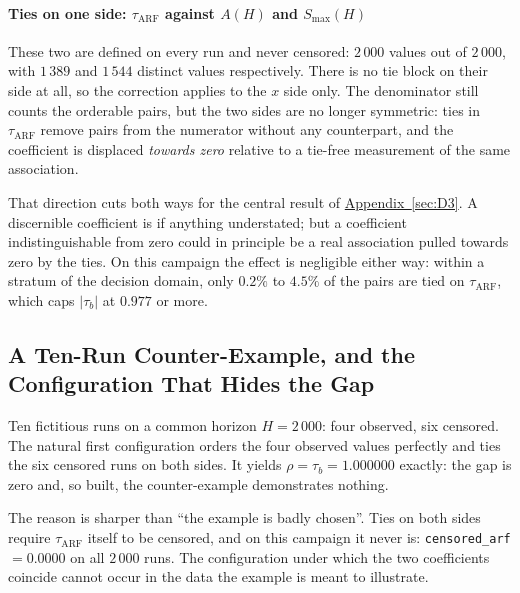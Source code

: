 \documentclass[10pt,conference]{IEEEtran}
\theoremstyle{definition}
\begin{document}
\paragraph{Ties on one side: $\tau_{\mathrm{ARF}}$ against $A(H)$ and $S_{\max}(H)$}
These two are defined on every run and never censored: $2\,000$ values out of $2\,000$,
with $1\,389$ and $1\,544$ distinct values respectively. There is no tie block on their
side at all, so the correction applies to the $x$ side only. The denominator still counts
the orderable pairs, but the two sides are no longer symmetric: ties in
$\tau_{\mathrm{ARF}}$ remove pairs from the numerator without any counterpart, and the
coefficient is displaced \emph{towards zero} relative to a tie-free measurement of the
same association.

That direction cuts both ways for the central result of \hyperref[sec:D3]{Appendix~\ref*{sec:D3}}. A
discernible coefficient is if anything understated; but a coefficient indistinguishable
from zero could in principle be a real association pulled towards zero by the ties. On this
campaign the effect is negligible either way: within a stratum of the decision domain,
only $0.2\%$ to $4.5\%$ of the pairs are tied on $\tau_{\mathrm{ARF}}$, which caps
$|\tau_b|$ at $0.977$ or more.

\subsection{A Ten-Run Counter-Example, and the Configuration That Hides the Gap}
\label{sec:d2:contre}

Ten fictitious runs on a common horizon $H = 2\,000$: four observed, six censored. The
natural first configuration orders the four observed values perfectly and ties the six
censored runs on both sides. It yields $\rho = \tau_b = 1.000000$ exactly: the gap is
zero and, so built, the counter-example demonstrates nothing.

The reason is sharper than ``the example is badly chosen''. Ties on both sides require
$\tau_{\mathrm{ARF}}$ itself to be censored, and on this campaign it never is:
\texttt{censored\_arf} $= 0.0000$ on all $2\,000$ runs. The configuration under which the
two coefficients coincide cannot occur in the data the example is meant to illustrate.
\end{document}
